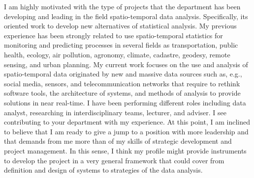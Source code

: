 \documentclass[11pt, a4paper]{awesome-cv}
\begin{document}
\begin{cvletter}
I am highly motivated with the type of projects that the department has been developing and leading in the field spatio-temporal data analysis. Specifically, its oriented work to develop new alternatives of statistical analysis. My previous experience has been strongly related to use spatio-temporal statistics for monitoring and predicting processes in several fields as transportation, public health, ecology, air pollution, agronomy, climate, cadastre, geodesy, remote sensing, and urban planning. My current work focuses on the use and analysis of spatio-temporal data originated by new and massive data sources such as, e.g., social media, sensors, and telecommunication networks that require to rethink software tools, the architecture of systems, and methods of analysis to provide solutions in near real-time. I have been performing different roles including data analyst, researching in interdisciplinary teams, lecturer, and adviser. I see contributing to your department with my experience. At this point, I am inclined to believe that I am ready to give a jump to a position with more leadership and that demands from me more than of my skills of strategic development and project management. In this sense, I think my profile might provide instruments to develop the project in a very general framework that could cover from definition and design of systems to strategies of the data analysis.



\end{cvletter}
\end{document}

